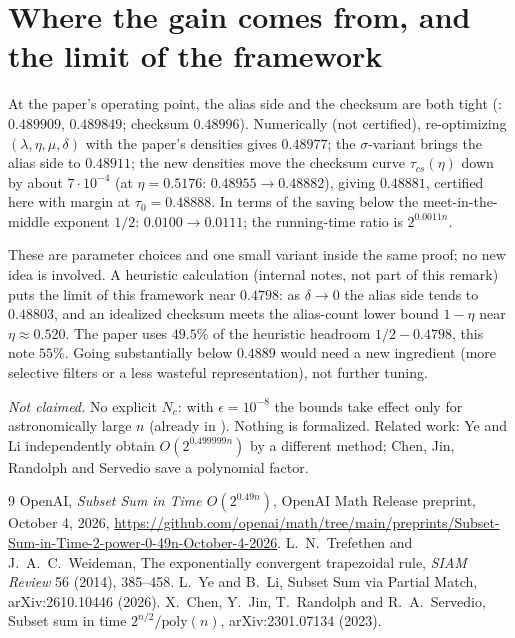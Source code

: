 \documentclass[11pt]{amsart}
\theoremstyle{remark}
\newcommand{\eps}{\epsilon}
\begin{document}
\section{Where the gain comes from, and the limit of the framework}
At the paper's operating point, the alias side and the checksum are both tight
(\cite[(5.8), (5.11)]{oai}: $0.489909$, $0.489849$; checksum $0.48996$). Numerically (not certified),
re-optimizing $(\lambda,\eta,\mu,\delta)$ with the paper's densities gives $0.48977$; the
$\sigma$-variant brings the alias side to $0.48911$; the new densities move the checksum curve
$\tau_{cs}(\eta)$ down by about $7\cdot10^{-4}$ (at $\eta=0.5176$: $0.48955\to0.48882$), giving
$0.48881$, certified here with margin at $\tau_0=0.48888$. In terms of the saving below the
meet-in-the-middle exponent $1/2$: $0.0100\to0.0111$; the running-time ratio is $2^{0.0011n}$.

These are parameter choices and one small variant inside the same proof; no new idea is involved.
A heuristic calculation (internal notes, not part of this remark) puts the limit of this framework
near $0.4798$: as $\delta\to0$ the alias side tends to $0.48803$, and an idealized checksum meets the
alias-count lower bound $1-\eta$ near $\eta\approx0.520$. The paper uses $49.5\%$ of the
heuristic headroom $1/2-0.4798$, this note $55\%$. Going substantially below $0.4889$ would need a new
ingredient (more selective filters or a less wasteful representation), not further tuning.

\smallskip\noindent\emph{Not claimed.} No explicit $N_c$: with $\eps=10^{-8}$ the bounds take effect
only for astronomically large $n$ (already in \cite{oai}). Nothing is formalized. Related work: Ye and
Li \cite{yeli} independently obtain $O(2^{0.499999n})$ by a different method; Chen, Jin, Randolph and
Servedio \cite{cjrs} save a polynomial factor.

\begin{thebibliography}{9}
 OpenAI, \emph{Subset Sum in Time $O(2^{0.49n})$}, OpenAI Math Release preprint, October 4, 2026,
\url{https://github.com/openai/math/tree/main/preprints/Subset-Sum-in-Time-2-power-0-49n-October-4-2026}.
 L.~N.~Trefethen and J.~A.~C.~Weideman, The exponentially convergent trapezoidal rule,
\emph{SIAM Review} 56 (2014), 385--458.
 L.~Ye and B.~Li, Subset Sum via Partial Match, arXiv:2610.10446 (2026).
 X.~Chen, Y.~Jin, T.~Randolph and R.~A.~Servedio, Subset sum in time $2^{n/2}/\mathrm{poly}(n)$,
arXiv:2301.07134 (2023).
\end{thebibliography}
\end{document}
